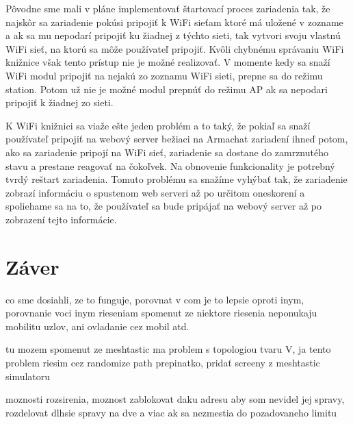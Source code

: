 \documentclass[slovak,master]{diploma}
\begin{document}
Pôvodne sme mali v pláne implementovať štartovací proces zariadenia tak, že najskôr sa zariadenie pokúsi pripojiť k WiFi sieťam ktoré má uložené v zozname a ak sa mu nepodarí 
pripojiť ku žiadnej z týchto sieti, tak vytvori svoju vlastnú WiFi sieť, na ktorú sa môže používateľ pripojiť. Kvôli chybnému správaniu WiFi knižnice však tento prístup nie je možné 
realizovať. V momente kedy sa snaží WiFi modul pripojiť na nejakú zo zoznamu WiFi sieti, prepne sa do režimu station. Potom už nie je možné modul prepnúť do režimu AP ak sa nepodari pripojiť 
k žiadnej zo sieti.

K WiFi knižnici sa viaže ešte jeden problém a to taký, že pokiaľ sa snaží používateľ pripojiť na webový server bežiaci na Armachat zariadení ihneď potom, ako sa zariadenie pripojí na WiFi sieť, 
zariadenie sa dostane do zamrznutého stavu a prestane reagovať na čokoľvek. Na obnovenie funkcionality je potrebný tvrdý reštart zariadenia. 
Tomuto problému sa snažíme vyhýbať tak, že zariadenie zobrazí informáciu o spustenom web serveri až po určitom oneskorení a spoliehame sa na to, že používateľ 
sa bude pripájať na webový server až po zobrazení tejto informácie.

\chapter{Záver}
co sme dosiahli, ze to funguje, porovnat v com je to lepsie oproti inym, porovnanie voci inym rieseniam
spomenut ze niektore riesenia neponukaju mobilitu uzlov, ani ovladanie cez mobil atd.

tu mozem spomenut ze meshtastic ma problem s topologiou tvaru V, ja tento problem riesim cez randomize path prepinatko, pridať screeny z meshtastic simulatoru

moznosti rozsirenia, moznost zablokovat daku adresu aby som nevidel jej spravy,
rozdelovat dlhsie spravy na dve a viac ak sa nezmestia do pozadovaneho limitu




\printbibliography[title={Literatura}, heading=bibintoc]

%

%
\end{document}
